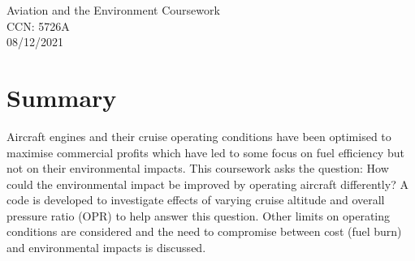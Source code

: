 \documentclass[12pt, a4paper]{article}
\begin{document}

\begingroup  
\centering
\LARGE Aviation and the Environment Coursework\\[1em]
\large CCN: 5726A \\
\large 08/12/2021 \\
\endgroup

\section{Summary}
Aircraft engines and their cruise operating conditions have been optimised to maximise commercial profits which have led to some focus on fuel efficiency but not on 
their environmental impacts. This coursework asks the question: How could the 
environmental impact be improved by operating aircraft differently? A code is developed to investigate effects of varying cruise altitude and overall pressure ratio (OPR) to help answer this question. Other limits on operating conditions are considered and the need to compromise between cost (fuel burn) and environmental impacts is discussed.
\end{document}
